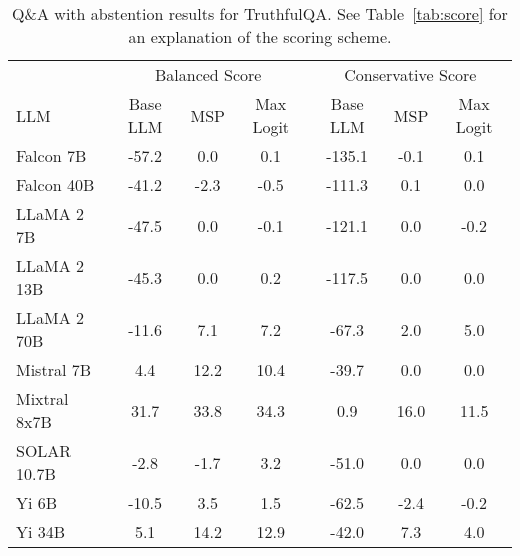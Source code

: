 \begin{table*}
\centering
\caption{Q\&A with abstention results for TruthfulQA. See Table~\ref{tab:score} for an explanation of the scoring scheme.}
\label{tab:truthfulqa_score}
\begin{tabular}{lcccccc}
\toprule
& \multicolumn{3}{c}{Balanced Score} & \multicolumn{3}{c}{Conservative Score} \\ 
LLM & Base LLM & MSP & Max Logit & Base LLM & MSP & Max Logit\\ 
\cmidrule(lr){1-1} \cmidrule(lr){2-4} \cmidrule(lr){5-7}
Falcon 7B & -57.2 & 0.0 & 0.1 & -135.1 & -0.1 & 0.1\\
Falcon 40B & -41.2 & -2.3 & -0.5 & -111.3 & 0.1 & 0.0\\
LLaMA 2 7B & -47.5 & 0.0 & -0.1 & -121.1 & 0.0 & -0.2\\
LLaMA 2 13B & -45.3 & 0.0 & 0.2 & -117.5 & 0.0 & 0.0\\
LLaMA 2 70B & -11.6 & 7.1 & 7.2 & -67.3 & 2.0 & 5.0\\
Mistral 7B & 4.4 & 12.2 & 10.4 & -39.7 & 0.0 & 0.0\\
Mixtral 8x7B & 31.7 & 33.8 & 34.3 & 0.9 & 16.0 & 11.5\\
SOLAR 10.7B & -2.8 & -1.7 & 3.2 & -51.0 & 0.0 & 0.0\\
Yi 6B & -10.5 & 3.5 & 1.5 & -62.5 & -2.4 & -0.2\\
Yi 34B & 5.1 & 14.2 & 12.9 & -42.0 & 7.3 & 4.0\\
\bottomrule
\end{tabular}
\end{table*}


